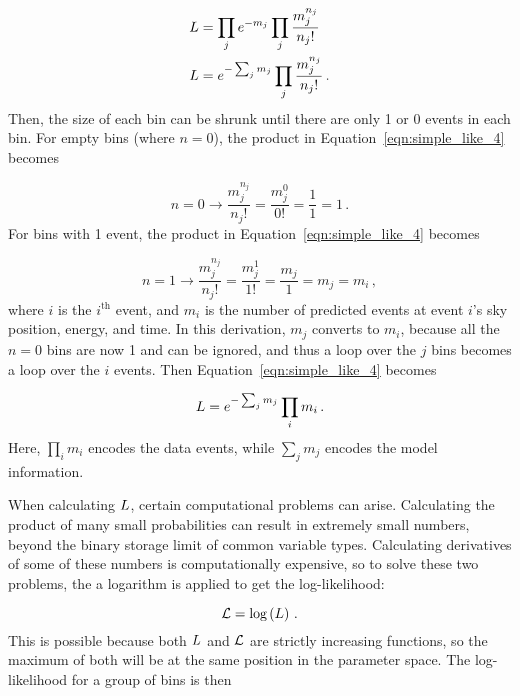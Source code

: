   \begin{equation}\label{eqn:simple_like_4}
    \begin{aligned}
      L &= \prod_j e^{-m_j} \prod_j \frac{m_j^{n_j}}{n_{j}!} \\
      L &= e^{- \sum_j m_j} \prod_j \frac{m_j^{n_j}}{n_{j}!} \,.
    \end{aligned}
  \end{equation}
  Then, the size of each bin can be shrunk until there are only 1 or 0 events in each bin.
  For empty bins (where $n=0$), the product in Equation~\ref{eqn:simple_like_4} becomes
  
  \begin{equation}\label{eqn:simple_like_4a}
    n=0 \rightarrow \frac{m_j^{n_j}}{n_j!} = \frac{m_j^{0}}{0!} = \frac{1}{1} = 1 \,.
  \end{equation}
  For bins with 1 event, the product in Equation~\ref{eqn:simple_like_4} becomes

  \begin{equation}\label{eqn:simple_like_4b}
    n=1 \rightarrow \frac{m_j^{n_j}}{n_j!} = \frac{m_j^1}{1!} = \frac{m_j}{1} = m_j = m_i \,,
  \end{equation}
  where $i$ is the $i^{\textrm{th}}$ event, and $m_i$ is the number of predicted events at event $i$'s sky position, energy, and time.
  In this derivation, $m_j$ converts to $m_i$, because all the $n=0$ bins are now 1 and can be ignored, and thus a loop over the $j$ bins becomes a loop over the $i$ events.
  Then Equation~\ref{eqn:simple_like_4} becomes
  
  \begin{equation}\label{eqn:simple_like_5}
    L = e^{- \sum_j m_j} \prod_i m_i \,.
  \end{equation}
  Here, $\prod_i m_i$ encodes the data events, while $\sum_j m_{j}$ encodes the model information.
  
  When calculating $L$, certain computational problems can arise.
  Calculating the product of many small probabilities can result in extremely small numbers, beyond the binary storage limit of common variable types.
  Calculating derivatives of some of these numbers is computationally expensive, so to solve these two problems, the a logarithm is applied to get the log-likelihood:
  
  \begin{equation}\label{eqn:simple_like_6}
    \mathcal{L} = \textrm{log} \left ( L \right )  \,.
  \end{equation}
  This is possible because both $L$ and $\mathcal{L}$ are strictly increasing functions, so the maximum of both will be at the same position in the parameter space.
  The log-likelihood for a group of bins is then
  
